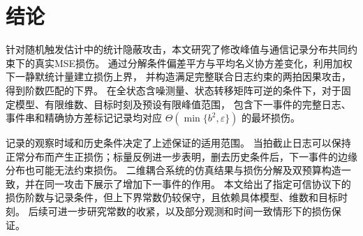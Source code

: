 \section{结论}
针对随机触发估计中的统计隐蔽攻击，本文研究了修改峰值与通信记录分布共同约束下的真实MSE损伤。
通过分解条件偏差平方与平均名义协方差变化，利用加权下一静默统计量建立损伤上界，
并构造满足完整联合日志约束的两拍因果攻击，得到阶数匹配的下界。
在全状态含噪测量、状态转移矩阵可逆的条件下，对于固定模型、有限维数、目标时刻及预设有限峰值范围，
包含下一事件的完整日志、事件串和精确协方差标记记录均对应 $\Theta(\min\{b^2,\varepsilon\})$ 的最坏损伤。

记录的观察时域和历史条件决定了上述保证的适用范围。
当拍截止日志可以保持正常分布而产生正损伤；标量反例进一步表明，删去历史条件后，下一事件的边缘分布也可能无法约束损伤。
二维耦合系统的仿真结果与损伤分解及双预算构造一致，并在同一攻击下展示了增加下一事件的作用。
本文给出了指定可信协议下的损伤阶数与记录条件，但上下界常数仍较保守，且依赖具体模型、维数和目标时刻。
后续可进一步研究常数的收紧，以及部分观测和时间一致情形下的损伤保证。
